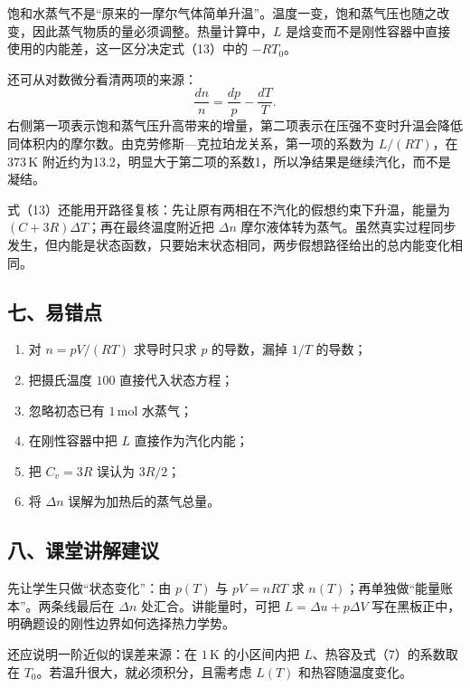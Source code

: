 \documentclass[12pt,a4paper,UTF8]{ctexart}
\newcommand{\tightlist}{\setlength{\itemsep}{0pt}\setlength{\parskip}{0pt}}
\begin{document}
饱和水蒸气不是``原来的一摩尔气体简单升温''。温度一变，饱和蒸气压也随之改变，因此蒸气物质的量必须调整。热量计算中，\(L\)
是焓变而不是刚性容器中直接使用的内能差，这一区分决定式（13）中的
\(-RT_0\)。

还可从对数微分看清两项的来源： \[
\frac{dn}{n}=\frac{dp}{p}-\frac{dT}{T}.
\]
右侧第一项表示饱和蒸气压升高带来的增量，第二项表示在压强不变时升温会降低同体积内的摩尔数。由克劳修斯---克拉珀龙关系，第一项的系数为
\(L/(RT)\)，在 \(373\,\mathrm K\)
附近约为13.2，明显大于第二项的系数1，所以净结果是继续汽化，而不是凝结。

式（13）还能用开路径复核：先让原有两相在不汽化的假想约束下升温，能量为
\((C+3R)\Delta T\)；再在最终温度附近把 \(\Delta n\)
摩尔液体转为蒸气。虽然真实过程同步发生，但内能是状态函数，只要始末状态相同，两步假想路径给出的总内能变化相同。

\subsection{七、易错点}\label{ux4e03ux6613ux9519ux70b9-4}

\begin{enumerate}
\def\labelenumi{\arabic{enumi}.}
\tightlist
\item
  对 \(n=pV/(RT)\) 求导时只求 \(p\) 的导数，漏掉 \(1/T\) 的导数；
\item
  把摄氏温度 \(100\) 直接代入状态方程；
\item
  忽略初态已有 \(1\,\mathrm{mol}\) 水蒸气；
\item
  在刚性容器中把 \(L\) 直接作为汽化内能；
\item
  把 \(C_v=3R\) 误认为 \(3R/2\)；
\item
  将 \(\Delta n\) 误解为加热后的蒸气总量。
\end{enumerate}

\subsection{八、课堂讲解建议}\label{ux516bux8bfeux5802ux8bb2ux89e3ux5efaux8bae-4}

先让学生只做``状态变化''：由 \(p(T)\) 与 \(pV=nRT\) 求
\(n(T)\)；再单独做``能量账本''。两条线最后在 \(\Delta n\)
处汇合。讲能量时，可把 \(L=\Delta u+p\Delta V\)
写在黑板正中，明确题设的刚性边界如何选择热力学势。

还应说明一阶近似的误差来源：在 \(1\,\mathrm K\) 的小区间内把
\(L\)、热容及式（7）的系数取在 \(T_0\)。若温升很大，就必须积分，且需考虑
\(L(T)\) 和热容随温度变化。
\end{document}
